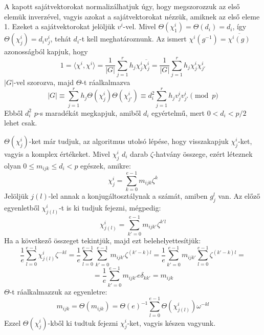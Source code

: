 A kapott sajátvektorokat normalizálhatjuk úgy, hogy megszorozzuk az első elemük inverzével, vagyis azokat a sajátvektorokat nézzük, amiknek az első eleme 1.
Ezeket a sajátvektorokat jelöljük $v^i$-vel. Mivel $\Theta(\chi^i_1)=\Theta(d_i)=d_i$, így $\Theta(\chi^i_j)=d_i v^i_j$, tehát $d_i$-t kell meghatároznunk.
Az ismert $\chi^i(g^{-1})=\overline{\chi^i(g)}$ azonosságból kapjuk, hogy
\begin{equation}
\label{eq:bdssch3}
1 = \langle \chi^i, \chi^i \rangle = \frac{1}{|G|}\sum_{j=1}^r h_j \chi^i_j \overline{\chi^i_j} = \frac{1}{|G|}\sum_{j=1}^r h_j \chi^i_j \chi^i_{j'}
\end{equation}
$|G|$-vel szorozva, majd $\Theta$-t ráalkalmazva
\begin{equation}
\label{eq:bdssch4}
|G| \equiv \sum_{j=1}^r h_j \Theta(\chi^i_j) \Theta(\chi^i_{j'}) \equiv d_i^2 \sum_{j=1}^r h_j v^i_j v^i_{j'} \pmod{p}
\end{equation}
Ebből $d_i^2$ $p$-s maradékát megkapjuk, amiből $d_i$ egyértelmű, mert $0<d_i<p/2$ lehet csak.

$\Theta(\chi^i_j)$-ket már tudjuk, az algoritmus utolsó lépése, hogy visszakapjuk $\chi^i_j$-ket, vagyis a komplex értékeket.
Mivel $\chi^i_j$ $d_i$ darab $\zeta$-hatvány összege, ezért léteznek olyan $0\le m_{ijk}\le d_i < p$ egészek, amikre:
\begin{equation}
\label{eq:bdsmijk1}
\chi^i_j = \sum_{k=0}^{e-1} m_{ijk}\zeta^k
\end{equation}
Jelöljük $j(l)$-lel annak a konjugáltosztálynak a számát, amiben $g_j^l$ van. Az előző egyenletből $\chi^i_{j(l)}$-t is ki tudjuk fejezni, mégpedig:
\begin{equation}
\label{eq:bdsmijk2}
\chi^i_{j(l)} = \sum_{k'=0}^{e-1} m_{ijk'}\zeta^{k'l}
\end{equation}
Ha a következő összeget tekintjük, majd ezt belehelyettesítjük:
\begin{equation*}
\label{eq:bdsmijk3a}
\frac{1}{e}\sum_{l=0}^{e-1} \chi^i_{j(l)} \zeta^{-kl} =
\frac{1}{e}\sum_{l=0}^{e-1} \sum_{k'=0}^{e-1} m_{ijk'}\zeta^{(k'-k)l} =
\frac{1}{e}\sum_{k'=0}^{e-1} m_{ijk'} \sum_{l=0}^{e-1} \zeta^{(k'-k)l} =
\end{equation*}
\begin{equation}
\label{eq:bdsmijk3b}
= \frac{1}{e}\sum_{k'=0}^{e-1} m_{ijk'} e \delta_{kk'} = m_{ijk}
\end{equation}
$\Theta$-t ráalkalmazzuk az egyenletre:
\begin{equation}
\label{eq:bdsmijk4}
m_{ijk} = \Theta(m_{ijk}) = \Theta(e)^{-1} \sum_{l=0}^{e-1} \Theta(\chi^i_{j(l)}) \omega^{-kl}
\end{equation}
Ezzel $\Theta(\chi^i_j)$-kből ki tudtuk fejezni $\chi^i_j$-ket, vagyis készen vagyunk.

